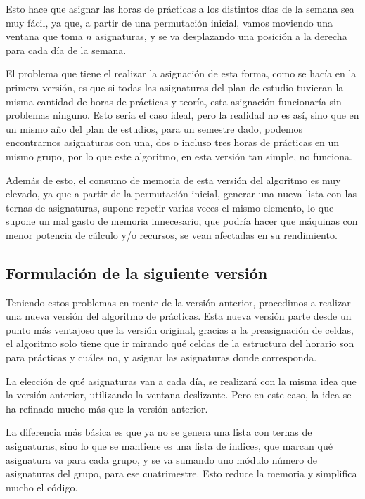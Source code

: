 Esto hace que asignar las horas de prácticas a los distintos días de la semana sea muy fácil, ya que, a partir de una permutación inicial, vamos moviendo una ventana que toma $n$ asignaturas, y se va desplazando una posición a la derecha para cada día de la semana. 

El problema que tiene el realizar la asignación de esta forma, como se hacía en la primera versión, es que si todas las asignaturas del plan de estudio tuvieran la misma cantidad de horas de prácticas y teoría, esta asignación funcionaría sin problemas ninguno. Esto sería el caso ideal, pero la realidad no es así, sino que en un mismo año del plan de estudios, para un semestre dado, podemos encontrarnos asignaturas con una, dos o incluso tres horas de prácticas en un mismo grupo, por lo que este algoritmo, en esta versión tan simple, no funciona. 

Además de esto, el consumo de memoria de esta versión del algoritmo es muy elevado, ya que a partir de la permutación inicial, generar una nueva lista con las ternas de asignaturas, supone repetir varias veces el mismo elemento, lo que supone un mal gasto de memoria innecesario, que podría hacer que máquinas con menor potencia de cálculo y/o recursos, se vean afectadas en su rendimiento.

\subsection{Formulación de la siguiente versión}

Teniendo estos problemas en mente de la versión anterior, procedimos a realizar una nueva versión del algoritmo de prácticas. Esta nueva versión parte desde un punto más ventajoso que la versión original, gracias a la preasignación de celdas, el algoritmo solo tiene que ir mirando qué celdas de la estructura del horario son para prácticas y cuáles no, y asignar las asignaturas donde corresponda.

La elección de qué asignaturas van a cada día, se realizará con la misma idea que la versión anterior, utilizando la ventana deslizante. Pero en este caso, la idea se ha refinado mucho más que la versión anterior. 

La diferencia más básica es que ya no se genera una lista con ternas de asignaturas, sino lo que se mantiene es una lista de índices, que marcan qué asignatura va para cada grupo, y se va sumando uno módulo número de asignaturas del grupo, para ese cuatrimestre. Esto reduce la memoria y simplifica mucho el código.

